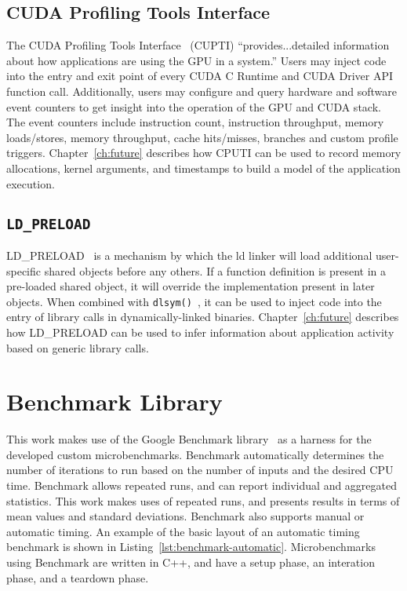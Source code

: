 \subsection{CUDA Profiling Tools Interface}
\label{sec:cupti}

The CUDA Profiling Tools Interface~\cite{nvidia2017cupti} (CUPTI) ``provides...detailed information about how applications are using the GPU in a system.''
Users may inject code into the entry and exit point of every CUDA C Runtime and CUDA Driver API function call.
Additionally, users may configure and query hardware and software event counters to get insight into the operation of the GPU and CUDA stack.
The event counters include instruction count, instruction throughput, memory loads/stores, memory throughput, cache hits/misses, branches and custom profile triggers.
Chapter~\ref{ch:future} describes how CPUTI can be used to record memory allocations, kernel arguments, and timestamps to build a model of the application execution.

\subsection{\texttt{LD\_PRELOAD}}
\label{sec:ldpreload}

LD\_PRELOAD~\cite{kerrisk2017ld} is a mechanism by which the ld linker will load additional user-specific shared objects before any others.
If a function definition is present in a pre-loaded shared object, it will override the implementation present in later objects.
When combined with \texttt{dlsym()}~\cite{kerrisk2017dlysm}, it can be used to inject code into the entry of library calls in dynamically-linked binaries.
Chapter~\ref{ch:future} describes how LD\_PRELOAD can be used to infer information about application activity based on generic library calls.


\section{Benchmark Library}
\label{sec:benchmark}

This work makes use of the Google Benchmark library~\cite{google2018benchmark} as a harness for the developed custom microbenchmarks.
Benchmark automatically determines the number of iterations to run based on the number of inputs and the desired CPU time.
Benchmark allows repeated runs, and can report individual and aggregated statistics.
This work makes uses of repeated runs, and presents results in terms of mean values and standard deviations.
Benchmark also supports manual or automatic timing.
An example of the basic layout of an automatic timing benchmark is shown in Listing~\ref{lst:benchmark-automatic}.
Microbenchmarks using Benchmark are written in C++, and have a setup phase, an interation phase, and a teardown phase.

